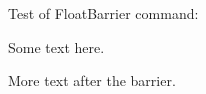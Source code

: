 \documentclass{article}
\begin{document}
Test of FloatBarrier command:

Some text here.

\FloatBarrier

More text after the barrier.



\end{document}
